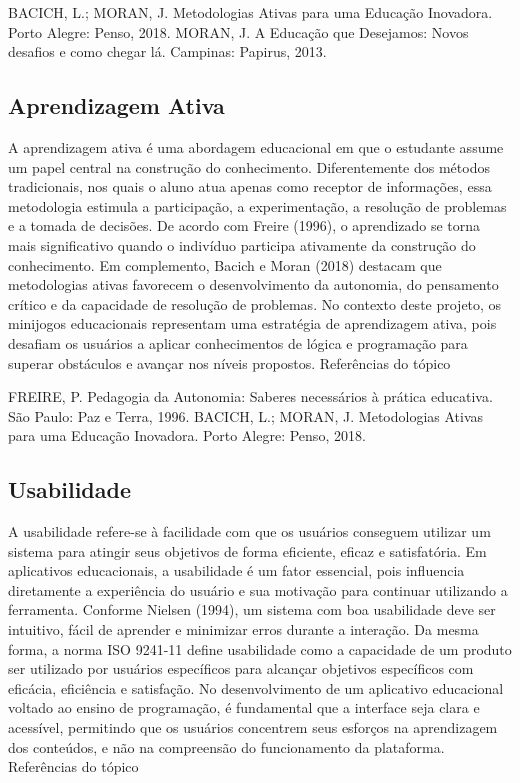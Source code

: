 \documentclass{article}
\begin{document}
BACICH, L.; MORAN, J. Metodologias Ativas para uma Educação Inovadora. Porto Alegre: Penso, 2018.
MORAN, J. A Educação que Desejamos: Novos desafios e como chegar lá. Campinas: Papirus, 2013.

\subsection{ Aprendizagem Ativa}
A aprendizagem ativa é uma abordagem educacional em que o estudante assume um papel central na construção do conhecimento. Diferentemente dos métodos tradicionais, nos quais o aluno atua apenas como receptor de informações, essa metodologia estimula a participação, a experimentação, a resolução de problemas e a tomada de decisões.
De acordo com Freire (1996), o aprendizado se torna mais significativo quando o indivíduo participa ativamente da construção do conhecimento. Em complemento, Bacich e Moran (2018) destacam que metodologias ativas favorecem o desenvolvimento da autonomia, do pensamento crítico e da capacidade de resolução de problemas.
No contexto deste projeto, os minijogos educacionais representam uma estratégia de aprendizagem ativa, pois desafiam os usuários a aplicar conhecimentos de lógica e programação para superar obstáculos e avançar nos níveis propostos.
Referências do tópico

FREIRE, P. Pedagogia da Autonomia: Saberes necessários à prática educativa. São Paulo: Paz e Terra, 1996.
BACICH, L.; MORAN, J. Metodologias Ativas para uma Educação Inovadora. Porto Alegre: Penso, 2018.


\subsection{ Usabilidade}
A usabilidade refere-se à facilidade com que os usuários conseguem utilizar um sistema para atingir seus objetivos de forma eficiente, eficaz e satisfatória. Em aplicativos educacionais, a usabilidade é um fator essencial, pois influencia diretamente a experiência do usuário e sua motivação para continuar utilizando a ferramenta.
Conforme Nielsen (1994), um sistema com boa usabilidade deve ser intuitivo, fácil de aprender e minimizar erros durante a interação. Da mesma forma, a norma ISO 9241-11 define usabilidade como a capacidade de um produto ser utilizado por usuários específicos para alcançar objetivos específicos com eficácia, eficiência e satisfação.
No desenvolvimento de um aplicativo educacional voltado ao ensino de programação, é fundamental que a interface seja clara e acessível, permitindo que os usuários concentrem seus esforços na aprendizagem dos conteúdos, e não na compreensão do funcionamento da plataforma.
Referências do tópico
\end{document}

